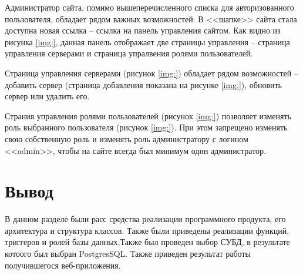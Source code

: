 Администратор сайта, помимо вышеперечисленного списка для авторизованного пользователя, обладает рядом важных возможностей. В <<шапке>> сайта стала доступна новая ссылка -- ссылка на панель управления сайтом. Как видно из рисунка \ref{img:}, данная панель отображает две страницы управления -- страница управления серверами и страница упралвения ролями пользователей.

Страница управления серверами (рисунок \ref{img:}) обладает рядом возможностей -- добавить сервер (страница добавления показана на рисунке \ref{img:}), обновить сервер или удалить его.

Страния управления ролями пользователей (рисунок \ref{img:}) позволяет изменять роль выбранного пользователя (рисунок \ref{img:}). При этом запрещено изменять свою собственную роль и изменять роль администратору с логином <<admin>>, чтобы на сайте всегда был минимум один администратор. 

\section*{Вывод}

В данном разделе были расс средства реализации программного продукта, его архитектура и структура классов. Также были приведены реализации функций, триггеров и ролей базы данных,Также был проведен выбор СУБД, в результате котоого был выбран PostgresSQL. Также приведен результат работы получившегося веб-приложения. 
